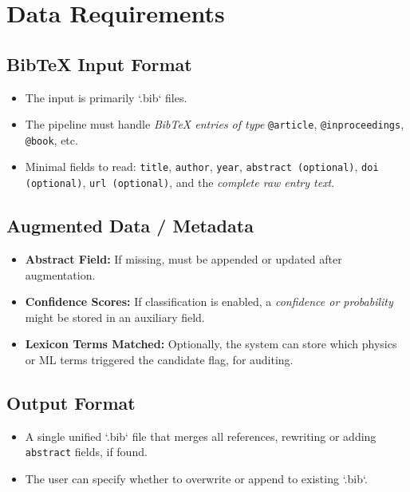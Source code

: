 \documentclass[12pt]{article}
\begin{document}
\newpage

\section{Data Requirements}

\subsection{BibTeX Input Format}
\begin{itemize}
  \item The input is primarily `.bib` files. 
  \item The pipeline must handle \emph{BibTeX entries of type} \texttt{@article}, \texttt{@inproceedings}, \texttt{@book}, etc.
  \item Minimal fields to read: \texttt{title}, \texttt{author}, \texttt{year}, \texttt{abstract (optional)}, \texttt{doi (optional)}, \texttt{url (optional)}, and the \emph{complete raw entry text}.
\end{itemize}

\subsection{Augmented Data / Metadata}
\begin{itemize}
  \item \textbf{Abstract Field:} If missing, must be appended or updated after augmentation. 
  \item \textbf{Confidence Scores:} If classification is enabled, a \emph{confidence or probability} might be stored in an auxiliary field. 
  \item \textbf{Lexicon Terms Matched:} Optionally, the system can store which physics or ML terms triggered the candidate flag, for auditing.
\end{itemize}

\subsection{Output Format}
\begin{itemize}
  \item A single unified `.bib` file that merges all references, rewriting or adding \texttt{abstract} fields, if found. 
  \item The user can specify whether to overwrite or append to existing `.bib`. 
\end{itemize}
\end{document}
